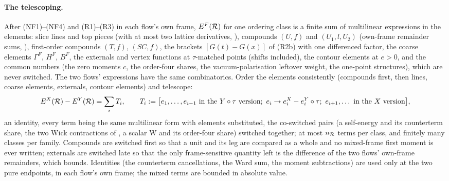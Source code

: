 
\paragraph{The telescoping.}
After (NF1)--(NF4) and (R1)--(R3) in each flow's own frame, $E^F(\mathcal R)$ for one ordering class is a finite sum of multilinear expressions in the elements: slice lines and top pieces (with at most two lattice derivatives, ), compounds $(U,f)$ and $(U_1,l,U_2)$ (own-frame remainder sums, ), first-order compounds $(T,f)$, $(SC,f)$, the brackets $[G(t)-G(x)]$ of (R2b) with one differenced factor, the coarse elements $\Gamma^F$, $H^F$, $B^F$, the externals and vertex functions at $\tau$-matched points (shifts included), the contour elements at $e>0$, and the common numbers (the zero moments $c$, the order-four shares, the vacuum-polarisation leftover weight, the one-point structures), which are never switched. The two flows' expressions have the same combinatorics. Order the elements consistently (compounds first, then lines, coarse elements, externals, contour elements) and telescope:
\[
E^X(\cR)-E^Y(\cR)=\sum_iT_i,\qquad T_i\defeq\big[e_1,\dots,e_{i-1}\text{ in the $Y\circ\tau$ version};\ e_i\to e_i^X-e_i^Y\circ\tau;\ e_{i+1},\dots\text{ in the $X$ version}\big],
\]
an identity, every term being the same multilinear form with elements substituted, the co-switched pairs (a self-energy and its counterterm share, the two Wick contractions of , a scalar W and its order-four share) switched together; at most $n_{\mathcal R}$ terms per class, and finitely many classes per family. Compounds are switched first so that a unit and its leg are compared as a whole and no mixed-frame first moment is ever written; externals are switched late so that the only frame-sensitive quantity left is the difference of the two flows' own-frame remainders, which  bounds. Identities (the counterterm cancellations, the Ward sum, the moment subtractions) are used only at the two pure endpoints, in each flow's own frame; the mixed terms are bounded in absolute value.

